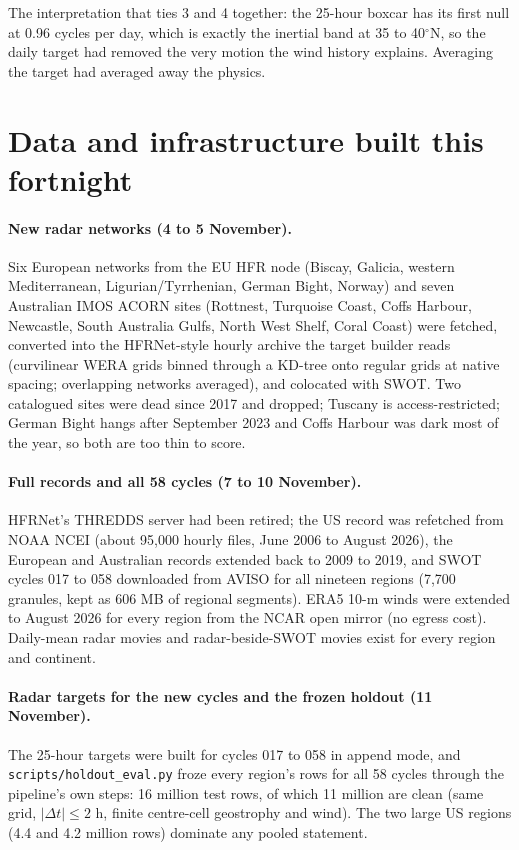 \documentclass[11pt]{article}
\newcommand{\code}[1]{\texttt{#1}}
\begin{document}
The interpretation that ties 3 and 4 together: the 25-hour boxcar has its first null at 0.96 cycles per day, which is exactly the inertial band at 35 to 40$^\circ$N, so the daily target had removed the very motion the wind history explains. Averaging the target had averaged away the physics.

\section{Data and infrastructure built this fortnight}\label{sec:data}

\paragraph{New radar networks (4 to 5 November).} Six European networks from the EU HFR node (Biscay, Galicia, western Mediterranean, Ligurian/Tyrrhenian, German Bight, Norway) and seven Australian IMOS ACORN sites (Rottnest, Turquoise Coast, Coffs Harbour, Newcastle, South Australia Gulfs, North West Shelf, Coral Coast) were fetched, converted into the HFRNet-style hourly archive the target builder reads (curvilinear WERA grids binned through a KD-tree onto regular grids at native spacing; overlapping networks averaged), and colocated with SWOT. Two catalogued sites were dead since 2017 and dropped; Tuscany is access-restricted; German Bight hangs after September 2023 and Coffs Harbour was dark most of the year, so both are too thin to score.

\paragraph{Full records and all 58 cycles (7 to 10 November).} HFRNet's THREDDS server had been retired; the US record was refetched from NOAA NCEI (about 95,000 hourly files, June 2006 to August 2026), the European and Australian records extended back to 2009 to 2019, and SWOT cycles 017 to 058 downloaded from AVISO for all nineteen regions (7,700 granules, kept as 606 MB of regional segments). ERA5 10-m winds were extended to August 2026 for every region from the NCAR open mirror (no egress cost). Daily-mean radar movies and radar-beside-SWOT movies exist for every region and continent.

\paragraph{Radar targets for the new cycles and the frozen holdout (11 November).} The 25-hour targets were built for cycles 017 to 058 in append mode, and \code{scripts/holdout\_eval.py} froze every region's rows for all 58 cycles through the pipeline's own steps: 16 million test rows, of which 11 million are clean (same grid, $|\Delta t| \le 2$ h, finite centre-cell geostrophy and wind). The two large US regions (4.4 and 4.2 million rows) dominate any pooled statement.
\end{document}
